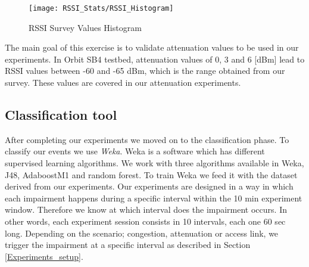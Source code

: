 \begin{figure}[h]
	\centering
	\texttt{[image: RSSI\_Stats/RSSI\_Histogram]}
	\caption{RSSI Survey Values Histogram}
	\label{fig:RSSI_Histogram}
\end{figure}

The main goal of this exercise is to validate attenuation values to be used in our experiments. In Orbit SB4 testbed, attenuation values of 0, 3 and 6 [dBm] lead to RSSI values between -60 and -65 dBm, which is the range obtained from our survey. These values are covered in our attenuation experiments.

\subsection{Classification tool}

After completing our experiments we moved on to the classification phase. To classify our events we use \emph{Weka}. Weka is a software which has different supervised learning algorithms. We work with three algorithms available in Weka, J48, AdaboostM1 and random forest. To train Weka we feed it with the dataset derived from our experiments. Our experiments are designed in a way in which each impairment happens during a specific interval within the 10 min experiment window. Therefore we know at which interval does the impairment occurs. In other words, each experiment session consists in 10 intervals, each one 60 sec long. Depending on the scenario; congestion, attenuation or access link, we trigger the impairment at a specific interval as described in Section \ref{Experiments_setup}.





